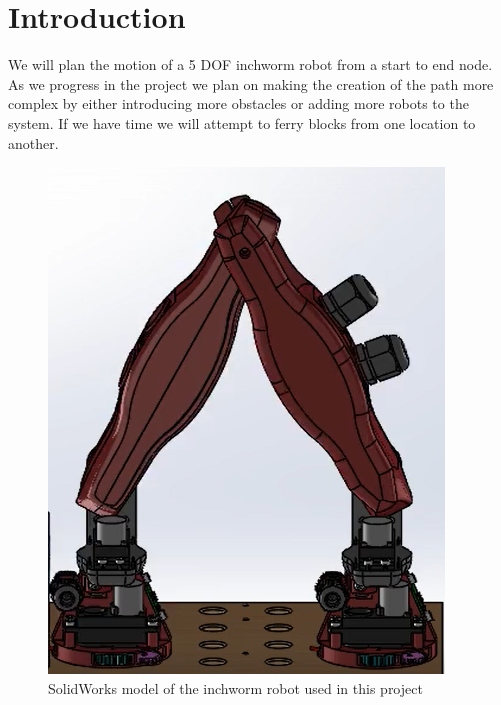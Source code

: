 \section{Introduction}

We will plan the motion of a 5 DOF inchworm robot from a start to end node. As we progress in the project we plan on making the creation of the path more complex by either introducing more obstacles or adding more robots to the system. If we have time we will attempt to ferry blocks from one location to another. 

\begin{figure}[ht]
    \includegraphics[width=\linewidth]{figures/InchwormPic.PNG}
    \caption{SolidWorks model of the inchworm robot used in this project \cite{PastMQP}}
    \label{fig:Inchworm}
\end{figure} 